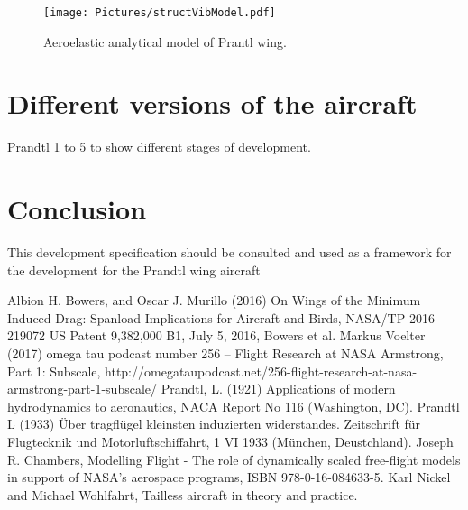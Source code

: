 \documentclass{report}
\begin{document}
\begin{figure}[htb]
	\begin{center}
		\texttt{[image: Pictures/structVibModel.pdf]}
	\end{center}

	\caption{Aeroelastic analytical model of Prantl wing.}
	\label{fig: structVibModel}
\end{figure}

\section{Different versions of the aircraft}

Prandtl 1 to 5 to show different stages of development.

\section{Conclusion}
This development specification should be consulted and used as a framework for the development for the Prandtl wing aircraft


\begin{thebibliography}{99}
 Albion H. Bowers, and Oscar J. Murillo (2016) On Wings of the Minimum Induced Drag:  Spanload Implications for Aircraft and Birds, NASA/TP-2016-219072
 US Patent 9,382,000 B1, July 5, 2016, Bowers et al.
 Markus Voelter (2017) omega tau podcast number 256 – Flight Research at NASA Armstrong, Part 1: Subscale, http://omegataupodcast.net/256-flight-research-at-nasa-armstrong-part-1-subscale/
 Prandtl, L.  (1921)  Applications  of  modern hydrodynamics  to  aeronautics,  NACA  Report  No  116 (Washington, DC).
 Prandtl L (1933) Über tragfl\"ugel kleinsten induzierten widerstandes. Zeitschrift für Flugtecknik und Motorluftschiffahrt, 1 VI 1933 (M\"unchen, Deustchland).
 Joseph R. Chambers, Modelling Flight - The role of dynamically scaled free-flight models in support of NASA's aerospace programs, ISBN 978-0-16-084633-5.
 Karl Nickel and Michael Wohlfahrt, Tailless aircraft in theory and practice.
\end{thebibliography}
\end{document}
